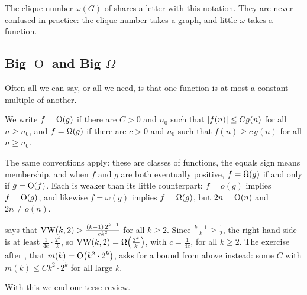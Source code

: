 The clique number $\omega(G)$ of  shares a letter with this notation. They are never confused in practice: the clique number takes a graph, and little $\omega$ takes a function.

\subsection{Big \texorpdfstring{$\operatorname{O}$}{O} and Big $\Omega$}

Often all we can say, or all we need, is that one function is at most a constant multiple of another.

\begin{boxdefinition}
    We write $f = \operatorname{O}\!\left( g \right)$ if there are $C > 0$ and $n_0$ such that $\left\lvert f(n) \right\rvert \leq C g(n)$ for all $n \geq n_0$, and $f = \Omega\!\left( g \right)$ if there are $c > 0$ and $n_0$ such that $f(n) \geq c \, g(n)$ for all $n \geq n_0$.
\end{boxdefinition}

The same conventions apply: these are classes of functions, the equals sign means membership, and when $f$ and $g$ are both eventually positive, $f = \Omega\!\left( g \right)$ if and only if $g = \operatorname{O}\!\left( f \right)$. Each is weaker than its little counterpart: $f = o(g)$ implies $f = \operatorname{O}\!\left( g \right)$, and likewise $f = \omega(g)$ implies $f = \Omega\!\left( g \right)$, but $2n = \operatorname{O}\!\left( n \right)$ and $2n \neq o(n)$.

\begin{boxexample}
     says that $\operatorname{VW}(k, 2) > \frac{(k - 1) \, 2^{k - 1}}{e k^2}$ for all $k \geq 2$. Since $\frac{k - 1}{k} \geq \frac{1}{2}$, the right-hand side is at least $\frac{1}{4e} \cdot \frac{2^k}{k}$, so $\operatorname{VW}(k, 2) = \Omega\!\left( \frac{2^k}{k} \right)$, with $c = \frac{1}{4e}$, for all $k \geq 2$. The exercise after , that $m(k) = \operatorname{O}\!\left( k^2 \cdot 2^k \right)$, asks for a bound from above instead: some $C$ with $m(k) \leq C k^2 \cdot 2^k$ for all large $k$.
\end{boxexample}

With this we end our terse review.
